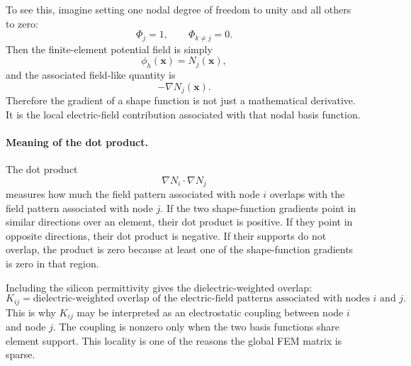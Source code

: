 \documentclass[11pt]{article}
\begin{document}
To see this, imagine setting one nodal degree of freedom to unity and all others to zero:
\begin{equation}
\Phi_j = 1, \qquad \Phi_{k\neq j}=0.
\end{equation}
Then the finite-element potential field is simply
\begin{equation}
\phi_h(\mathbf{x})=N_j(\mathbf{x}),
\end{equation}
and the associated field-like quantity is
\begin{equation}
-\nabla N_j(\mathbf{x}).
\end{equation}
Therefore the gradient of a shape function is not just a mathematical derivative. It is the local electric-field contribution associated with that nodal basis function.

\paragraph{Meaning of the dot product.}
The dot product
\begin{equation}
\nabla N_i \cdot \nabla N_j
\end{equation}
measures how much the field pattern associated with node $i$ overlaps with the field pattern associated with node $j$. If the two shape-function gradients point in similar directions over an element, their dot product is positive. If they point in opposite directions, their dot product is negative. If their supports do not overlap, the product is zero because at least one of the shape-function gradients is zero in that region.

Including the silicon permittivity gives the dielectric-weighted overlap:
\begin{equation}
\boxed{
K_{ij}
= \text{dielectric-weighted overlap of the electric-field patterns associated with nodes } i \text{ and } j.
}
\end{equation}
This is why $K_{ij}$ may be interpreted as an electrostatic coupling between node $i$ and node $j$. The coupling is nonzero only when the two basis functions share element support. This locality is one of the reasons the global FEM matrix is sparse.
\end{document}
